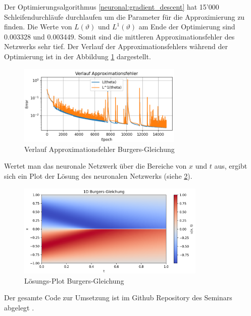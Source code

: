 Der Optimierungsalgorithmus \ref{neuronal:gradient_descent} hat 15'000 Schleifendurchläufe durchlaufen um die Parameter für die Approximierung zu finden.
Die Werte von $L(\vartheta)$ und $L^1(\vartheta)$ am Ende der Optimierung sind 0.003328 und 0.003449.
Somit sind die mittleren Approximationsfehler des Netzwerks sehr tief.
Der Verlauf der Approximationsfehlers während der Optimierung ist in der Abbildung \ref{fig:fehler_burgers} dargestellt.

\begin{figure}
    \centering
    \hspace*{-0.1\textwidth}
    \includegraphics[width=0.7\textwidth]{papers/neuronal/images/approximation_error_burgers.png}
    \caption{Verlauf Approximationsfehler Burgers-Gleichung}
    \label{fig:fehler_burgers}
\end{figure}

Wertet man das neuronale Netzwerk über die Bereiche von $x$ und $t$ aus, ergibt sich ein Plot der Lösung des neuronalen Netzwerks (siehe \ref{fig:loesung_burgers}).

\begin{figure}
    \centering
    \includegraphics[width=0.8\textwidth]{papers/neuronal/images/prediction_burgers_net.png}
    \caption{Lösungs-Plot Burgers-Gleichung}
    \label{fig:loesung_burgers}
\end{figure}

Der gesamte Code zur Umsetzung ist im Github Repository des Seminars abgelegt \cite{neuronal:github_source_code}.
